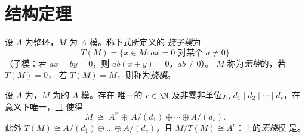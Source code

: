 \section{结构定理}

\begin{definition}\label{def:b3:modules:torsion}
设 $A$ 为整环，$M$ 为 $A$-模。称下式所定义的
\emph{挠子模}为
\[
T(M) = \{x \in M : ax = 0 \text{ 对某个 } a \neq 0\}
\]
（子模：若 $ax = by = 0$，则 $ab(x + y) = 0$，$ab \ne 0$）。
$M$ 称为\emph{无挠}的，若 $T(M) = 0$，
若 $T(M) = M$，则称为\emph{挠模}。
\end{definition}

\begin{theorem}[主理想整环上有限生成模的
结构]\label{thm:b3:modules:structure}
设 $A$ 为，$M$ 为的 $A$-模。存在
唯一的 $r \in \N$ 及非零非单位元 $d_1 \mid d_2 \mid
\cdots \mid d_s$，在意义下唯一，且
使得
\[
M \;\cong\; A^r \,\oplus\, A/(d_1) \oplus \cdots \oplus A/(d_s).
\]
此外 $T(M) \cong A/(d_1)\oplus\dots\oplus A/(d_s)$，且 $M/T(M)
\cong A^r$：上的\emph{无挠}模
是。
\end{theorem}

